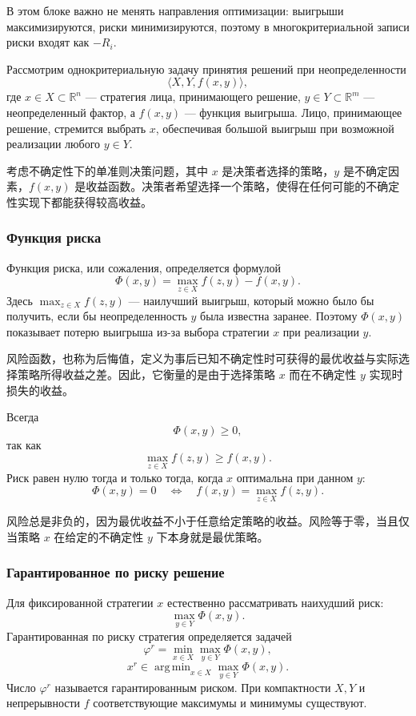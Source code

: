 \documentclass[12pt,a4paper]{article}
\newcommand{\R}{\mathbb{R}}
\DeclareMathOperator*{\argmin}{arg\,min}
\newcommand{\zh}[1]{\par\noindent #1\par}
\begin{document}
В этом блоке важно не менять направления оптимизации: выигрыши максимизируются, риски минимизируются, поэтому в многокритериальной записи риски входят как $-R_i$.



Рассмотрим однокритериальную задачу принятия решений при неопределенности
\[
\langle X,Y,f(x,y)\rangle,
\]
где $x\in X\subset\R^n$ --- стратегия лица, принимающего решение, $y\in Y\subset\R^m$ --- неопределенный фактор, а $f(x,y)$ --- функция выигрыша. Лицо, принимающее решение, стремится выбрать $x$, обеспечивая большой выигрыш при возможной реализации любого $y\in Y$.

\zh{考虑不确定性下的单准则决策问题，其中 $x$ 是决策者选择的策略，$y$ 是不确定因素，$f(x,y)$ 是收益函数。决策者希望选择一个策略，使得在任何可能的不确定性实现下都能获得较高收益。}

\subsubsection{Функция риска}
Функция риска, или сожаления, определяется формулой
\[
\Phi(x,y)=\max_{z\in X} f(z,y)-f(x,y).
\]
Здесь $\max_{z\in X}f(z,y)$ --- наилучший выигрыш, который можно было бы получить, если бы неопределенность $y$ была известна заранее. Поэтому $\Phi(x,y)$ показывает потерю выигрыша из-за выбора стратегии $x$ при реализации $y$.

\zh{风险函数，也称为后悔值，定义为事后已知不确定性时可获得的最优收益与实际选择策略所得收益之差。因此，它衡量的是由于选择策略 $x$ 而在不确定性 $y$ 实现时损失的收益。}

Всегда
\[
\Phi(x,y)\ge 0,
\]
так как
\[
\max_{z\in X}f(z,y)\ge f(x,y).
\]
Риск равен нулю тогда и только тогда, когда $x$ оптимальна при данном $y$:
\[
\Phi(x,y)=0
\quad\Longleftrightarrow\quad
f(x,y)=\max_{z\in X}f(z,y).
\]

\zh{风险总是非负的，因为最优收益不小于任意给定策略的收益。风险等于零，当且仅当策略 $x$ 在给定的不确定性 $y$ 下本身就是最优策略。}

\subsubsection{Гарантированное по риску решение}
Для фиксированной стратегии $x$ естественно рассматривать наихудший риск:
\[
\max_{y\in Y}\Phi(x,y).
\]
Гарантированная по риску стратегия определяется задачей
\[
\varphi^r=\min_{x\in X}\max_{y\in Y}\Phi(x,y),
\]
\[
x^r\in \argmin_{x\in X}\max_{y\in Y}\Phi(x,y).
\]
Число $\varphi^r$ называется гарантированным риском. При компактности $X,Y$ и непрерывности $f$ соответствующие максимумы и минимумы существуют.
\end{document}
